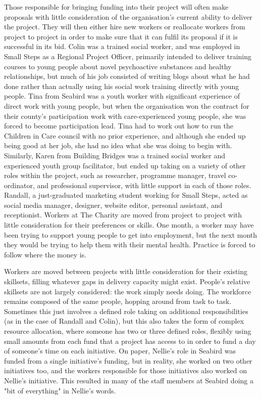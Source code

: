 Those responsible for bringing funding into their project will often make proposals with little consideration of the organisation's current ability to deliver the project. They will then either hire new workers or reallocate workers from project to project in order to make sure that it can fulfil its proposal if it is successful in its bid. Colin was a trained social worker, and was employed in Small Steps as a Regional Project Officer, primarily intended to deliver training courses to young people about novel psychoactive substances and healthy relationships, but much of his job consisted of writing blogs about what he had done rather than actually using his social work training directly with young people. Tina from Seabird was a youth worker with significant experience of direct work with young people, but when the organisation won the contract for their county’s participation work with care-experienced young people, she was forced to become participation lead. Tina had to work out how to run the Children in Care council with no prior experience, and although she ended up being good at her job, she had no idea what she was doing to begin with. Similarly, Karen from Building Bridges was a trained social worker and experienced youth group facilitator, but ended up taking on a variety of other roles within the project, such as researcher, programme manager, travel co-ordinator, and professional supervisor, with little support in each of those roles. Randall, a just-graduated marketing student working for Small Steps, acted as social media manager, designer, website editor, personal assistant, and receptionist. Workers at The Charity are moved from project to project with little consideration for their preferences or skills. One month, a worker may have been trying to support young people to get into employment, but the next month they would be  trying to help them with their mental health. Practice is forced to follow where the money is.

Workers are moved between projects with little consideration for their existing skillsets, filling whatever gaps in delivery capacity might exist. People's relative skillsets are not largely considered: the work simply needs doing. The workforce remains composed of the same people, hopping around from task to task. Sometimes this just involves a defined role taking on additional responsibilities (as in the case of Randall and Colin), but this also takes the form of complex resource allocation, where someone has two or three defined roles, flexibly using small amounts from each fund that a project has access to in order to fund a day of someone’s time on each initiative. On paper, Nellie's role in Seabird was funded from a single initiative’s funding, but in reality, she worked on two other initiatives too, and the workers responsible for those initiatives also worked on Nellie’s initiative. This resulted in many of the staff members at Seabird doing a "bit of everything" in Nellie’s words. 

